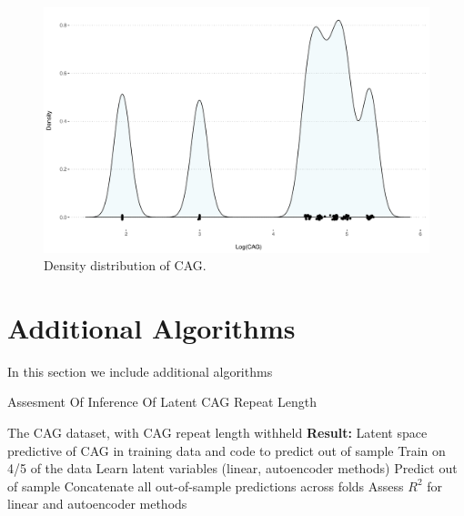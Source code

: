 \documentclass{article}
\begin{document}
\begin{figure}[ht!]
  \centering
  \includegraphics[width=\linewidth]{./images/cagPlots.pdf}
      \caption{\label{fig_cag_density} Density distribution of CAG. }
\end{figure}

\clearpage
\section{Additional Algorithms}
In this section we include additional algorithms

\begin{algorithm}%
 \caption{Assesment Of Inference Of Latent CAG Repeat Length}
 \label{alg_cag}
\begin{algorithmic}
 The CAG dataset, with CAG repeat length withheld
\STATE \textbf{Result:} Latent space predictive of CAG in training data and code to predict out of sample
  \STATE Train on 4/5 of the data
  \STATE Learn latent variables (linear, autoencoder methods)
  \STATE Predict out of sample
 \ENDFOR
 \STATE Concatenate all out-of-sample predictions across folds
 \STATE Assess $R^{2}$ for linear and autoencoder methods
\end{algorithmic}
\end{algorithm}
\end{document}
